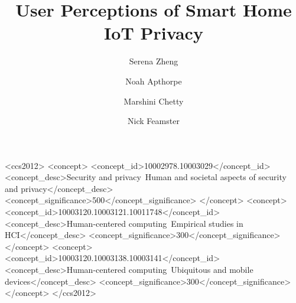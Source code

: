 \documentclass[format=acmsmall, review=false, screen=true]{acmart}
\begin{document}
\title[User Perceptions of Smart Home IoT Privacy]{User Perceptions of Smart Home IoT Privacy}


\author{Serena Zheng}

\author{Noah Apthorpe}

\author{Marshini Chetty}

\author{Nick Feamster}


\begin{abstract}

\end{abstract}


%
%
\begin{CCSXML}
<ccs2012>
<concept>
<concept_id>10002978.10003029</concept_id>
<concept_desc>Security and privacy~Human and societal aspects of security and privacy</concept_desc>
<concept_significance>500</concept_significance>
</concept>
<concept>
<concept_id>10003120.10003121.10011748</concept_id>
<concept_desc>Human-centered computing~Empirical studies in HCI</concept_desc>
<concept_significance>300</concept_significance>
</concept>
<concept>
<concept_id>10003120.10003138.10003141</concept_id>
<concept_desc>Human-centered computing~Ubiquitous and mobile devices</concept_desc>
<concept_significance>300</concept_significance>
</concept>
</ccs2012>
\end{CCSXML}


%
%
\end{document}
